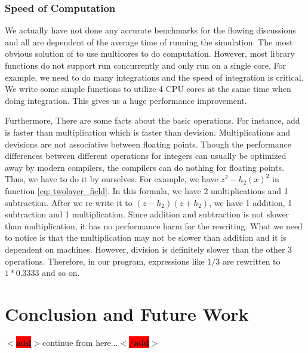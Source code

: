 \documentclass[12pt]{report}
\newcommand{\add}[1]{
  $<$\colorbox{red}{\textbf{add}}$>$#1$<$\colorbox{red}{\textbf{/add}}$>$
}
\begin{document}
        \subsection{Speed of Computation}
          We actually have not done any accurate benchmarks for the flowing discussions and all are 
          dependent of the average time of running the simulation.
          The most obvious solution of to use multicores to do computation. However, most library functions 
          do not support run concurrently and only run on a single core. For example, we need to do many 
          integrations and the speed of integration is critical. We write some simple functions to 
          utilize 4 CPU cores at the same time when doing integration. 
          This gives us a huge performance improvement.

          Furthermore, There are some facts about the basic operations. For instance, add is faster than 
          multiplication which is faster than devision. Multiplications and devisions are not associative
          between floating points. 
          Though the performance differences between different operations for integers can usually be optimized 
          away by modern compilers, the compilers can do nothing for floating points. Thus, we have to do it 
          by ourselves. For example, we have $z^2 - h_2\left(x\right)^2$ in function \ref{eq: twolayer_field}.
          In this formula, we have 2 multiplications and 1 subtraction. After we re-write it to 
          $\left(z-h_2\right)\left(z + h_2\right)$, we have 1 addition, 1 subtraction and 1 multiplication.
          Since addition and subtraction is not slower than multiplication, it has no performance harm 
          for the rewriting. What we need to notice is that the multiplication may not be slower than addition
          and it is dependent on machines. However, division is definitely slower than the other 3 operations. 
          Therefore, in our program, expressions like $1 / 3$ are rewritten to $1*0.3333$ and so on.  


      \chapter{Conclusion and Future Work}
        \add{continue from here...}


          
\end{document}
